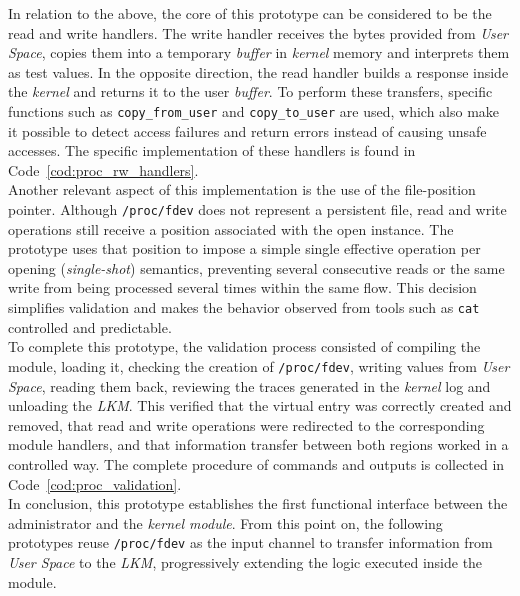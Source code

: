 In relation to the above, the core of this prototype can be considered to be the read and write handlers.
The write handler receives the bytes provided from \textit{User Space}, copies them into a temporary \textit{buffer} in \textit{kernel} memory and interprets them as test values.
In the opposite direction, the read handler builds a response inside the \textit{kernel} and returns it to the user \textit{buffer}.
To perform these transfers, specific functions such as \texttt{copy\_from\_user} and \texttt{copy\_to\_user} are used, which also make it possible to detect access failures and return errors instead of causing unsafe accesses.
The specific implementation of these handlers is found in Code~\ref{cod:proc_rw_handlers}.\\

Another relevant aspect of this implementation is the use of the file-position pointer.
Although \texttt{/proc/fdev} does not represent a persistent file, read and write operations still receive a position associated with the open instance.
The prototype uses that position to impose a simple single effective operation per opening (\textit{single-shot}) semantics, preventing several consecutive reads or the same write from being processed several times within the same flow.
This decision simplifies validation and makes the behavior observed from tools such as \texttt{cat} controlled and predictable.\\

To complete this prototype, the validation process consisted of compiling the module, loading it, checking the creation of \texttt{/proc/fdev}, writing values from \textit{User Space}, reading them back, reviewing the traces generated in the \textit{kernel} log and unloading the \textit{LKM}.
This verified that the virtual entry was correctly created and removed, that read and write operations were redirected to the corresponding module handlers, and that information transfer between both regions worked in a controlled way.
The complete procedure of commands and outputs is collected in Code~\ref{cod:proc_validation}.\\

In conclusion, this prototype establishes the first functional interface between the administrator and the \textit{kernel module}.
From this point on, the following prototypes reuse \texttt{/proc/fdev} as the input channel to transfer information from \textit{User Space} to the \textit{LKM}, progressively extending the logic executed inside the module.\\\\


